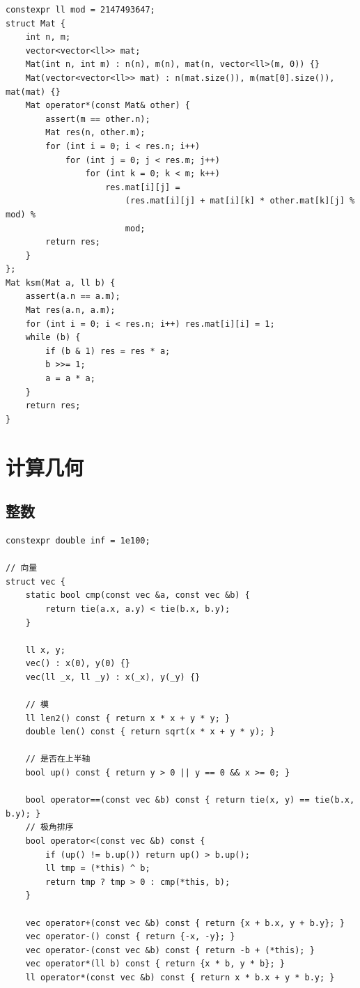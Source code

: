 \documentclass[UTF8]{ctexart}
\begin{document}
\begin{sloppypar}
\begin{lstlisting}[style=cpp]
constexpr ll mod = 2147493647;
struct Mat {
    int n, m;
    vector<vector<ll>> mat;
    Mat(int n, int m) : n(n), m(n), mat(n, vector<ll>(m, 0)) {}
    Mat(vector<vector<ll>> mat) : n(mat.size()), m(mat[0].size()), mat(mat) {}
    Mat operator*(const Mat& other) {
        assert(m == other.n);
        Mat res(n, other.m);
        for (int i = 0; i < res.n; i++)
            for (int j = 0; j < res.m; j++)
                for (int k = 0; k < m; k++)
                    res.mat[i][j] =
                        (res.mat[i][j] + mat[i][k] * other.mat[k][j] % mod) %
                        mod;
        return res;
    }
};
Mat ksm(Mat a, ll b) {
    assert(a.n == a.m);
    Mat res(a.n, a.m);
    for (int i = 0; i < res.n; i++) res.mat[i][i] = 1;
    while (b) {
        if (b & 1) res = res * a;
        b >>= 1;
        a = a * a;
    }
    return res;
}
\end{lstlisting}

\clearpage

\section{计算几何}

\subsection{整数}

\begin{lstlisting}[style=cpp]
constexpr double inf = 1e100;

// 向量
struct vec {
    static bool cmp(const vec &a, const vec &b) {
        return tie(a.x, a.y) < tie(b.x, b.y);
    }

    ll x, y;
    vec() : x(0), y(0) {}
    vec(ll _x, ll _y) : x(_x), y(_y) {}

    // 模
    ll len2() const { return x * x + y * y; }
    double len() const { return sqrt(x * x + y * y); }

    // 是否在上半轴
    bool up() const { return y > 0 || y == 0 && x >= 0; }

    bool operator==(const vec &b) const { return tie(x, y) == tie(b.x, b.y); }
    // 极角排序
    bool operator<(const vec &b) const {
        if (up() != b.up()) return up() > b.up();
        ll tmp = (*this) ^ b;
        return tmp ? tmp > 0 : cmp(*this, b);
    }

    vec operator+(const vec &b) const { return {x + b.x, y + b.y}; }
    vec operator-() const { return {-x, -y}; }
    vec operator-(const vec &b) const { return -b + (*this); }
    vec operator*(ll b) const { return {x * b, y * b}; }
    ll operator*(const vec &b) const { return x * b.x + y * b.y; }


\end{lstlisting}
\end{sloppypar}
\end{document}
